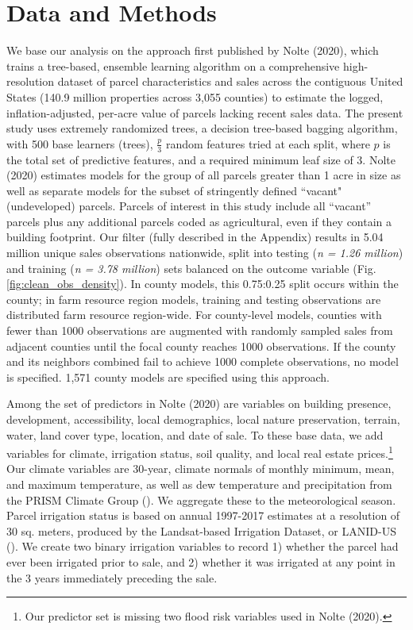 \documentclass[12pt]{article}
\begin{document}
\section{Data and Methods}
We base our analysis on the approach  first published by Nolte (2020), which trains a tree-based, ensemble learning algorithm on a comprehensive high-resolution dataset of parcel characteristics and sales across the contiguous United States (140.9 million properties across 3,055 counties) to estimate the logged, inflation-adjusted, per-acre value of parcels lacking recent sales data. The present study uses extremely randomized trees, a decision tree-based bagging algorithm, with 500 base learners (trees), $\frac{p}{3}$ random features tried at each split, where $p$ is the total set of predictive features, and a required minimum leaf size of 3. Nolte (2020) estimates models for the group of all parcels greater than 1 acre in size as well as separate models for the subset of stringently defined ``vacant" (undeveloped) parcels. Parcels of interest in this study include all ``vacant'' parcels plus any additional parcels coded as agricultural, even if they contain a building footprint. Our filter (fully described in the Appendix) results in 5.04 million unique sales observations nationwide, split into testing (\textit{n = 1.26 million}) and training (\textit{n = 3.78 million}) sets balanced on the outcome variable (Fig. \ref{fig:clean_obs_density}). In county models, this 0.75:0.25 split occurs within the county; in farm resource region models, training and testing observations are distributed farm resource region-wide. For county-level models, counties with fewer than 1000 observations are augmented with randomly sampled sales from adjacent counties until the focal county reaches 1000 observations. If the county and its neighbors combined fail to achieve 1000 complete observations, no model is specified. 1,571 county models are specified using this approach.

Among the set of predictors in Nolte (2020) are variables on building presence, development, accessibility, local demographics, local nature preservation, terrain, water, land cover type, location, and date of sale. To these base data, we add variables for climate, irrigation status, soil quality, and local real estate prices.\footnote{Our predictor set is missing two flood risk variables used in Nolte (2020).} Our climate variables are 30-year, climate normals of monthly minimum, mean, and maximum temperature, as well as dew temperature and precipitation from the PRISM Climate Group (\cite{PRISMClimate2021}). We aggregate these to the meteorological season. Parcel irrigation status is based on annual 1997-2017 estimates at a resolution of 30 sq. meters, produced by the Landsat-based Irrigation Dataset, or LANID-US (\cite{Xie2021MappingStates}). We create two binary irrigation variables to record 1) whether the parcel had ever been irrigated prior to sale, and 2) whether it was irrigated at any point in the 3 years immediately preceding the sale. 
\end{document}
